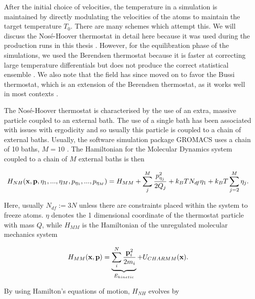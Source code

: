 After the initial choice of velocities, the temperature in a simulation is maintained by directly modulating the velocities of the atoms to maintain the target temperature $T_0$. There are many schemes which attempt this. We will discuss the Nos\'e-Hoover thermostat in detail here because it was used during the production runs in this thesis  \cite{nose1984, hoover1985, martyna1992}. However, for the equilibration phase of the simulations, we used the Berendsen thermostat because it is faster at correcting large temperature differentials but does not produce the correct statistical ensemble \cite{bussi2007, berendsen1984a}. We also note that the field has since moved on to favor the Bussi thermostat, which is an extension of the Berendsen thermostat, as it works well in most contexts  \cite{bussi2007, braun2019}.

The Nos\'e-Hoover thermostat is characterised by the use of an extra, massive particle coupled to an external bath. The use of a single bath has been associated with issues with ergodicity and so usually this particle is coupled to a chain of external baths. Usually, the software simulation package GROMACS uses a chain of 10 baths, $M=10$ \cite{martyna1992, martyna1996, abraham2015}. The Hamiltonian for the Molecular Dynamics system coupled to a chain of $M$ external baths is then

\begin{equation}
	H_{NH} (\bold{x},\bold{p},\eta_1 , ... , \eta_M, p_{\eta_1}, ...,  p_{\eta_M}  )= H_{MM} + \sum_j^M \frac{p^2_{\eta_j}}{2Q_j} +k_BT  N_{df}   \eta_1   + k_BT \sum_{j=2}^M\eta_j.
\end{equation}

Here, usually $N_{df} := 3N$ unless there are constraints placed within the system to freeze atoms. $\eta$ denotes the 1 dimensional coordinate of the thermostat particle with mass $Q$, while $H_{MM}$ is the Hamiltonian of the unregulated molecular mechanics system 

\begin{equation}
H_{MM}(\bold{x},\bold{p}) = \underbrace{\sum_i^N \frac{\bold{p}_i^2}{2 m_i}}_{E_{kinetic}} + U_{CHARMM} (\bold{x}). 
\end{equation}

By using Hamilton's equations of motion, $H_{NH}$ evolves by

